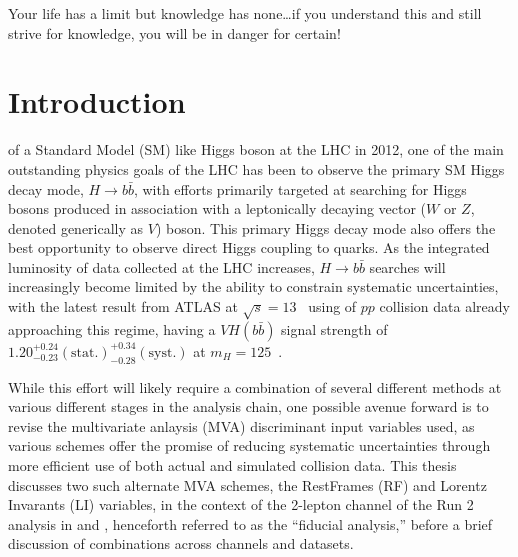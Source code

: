 \begin{savequote}[75mm]
Your life has a limit but knowledge has none\ldots if you understand this and still strive for knowledge, you will be in danger for certain!
\end{savequote}

\chapter{Introduction}

 of a Standard Model (SM) like Higgs boson at the LHC in 2012\cite{:2012gk}\cite{:2012gu}, one of the main outstanding physics goals of the LHC has been to observe the primary SM Higgs decay mode, $H\to b\bar{b}$, with efforts primarily targeted at searching for Higgs bosons produced in association with a leptonically decaying vector ($W$ or $Z$, denoted generically as $V$) boson.  This primary Higgs decay mode also offers the best opportunity to observe direct Higgs coupling to quarks.  As the integrated luminosity of data collected at the LHC increases, $H\to b\bar{b}$ searches will increasingly become limited by the ability to constrain systematic uncertainties, with the latest result from ATLAS at $\sqrt{s}=13$ \TeV\, using \LUMI of $pp$ collision data already approaching this regime, having a $VH\left(b\bar{b}\right)$ signal strength of $1.20^{+0.24}_{-0.23}(\textrm{stat.})^{+0.34}_{-0.28}(\textrm{syst.})$ at $m_{H}=125$ \GeV\,\cite{paper}.

While this effort will likely require a combination of several different methods at various different stages in the analysis chain, one possible avenue forward is to revise the multivariate anlaysis (MVA) discriminant input variables used, as various schemes offer the promise of reducing systematic uncertainties through more efficient use of both actual and simulated collision data.  This thesis discusses two such alternate MVA schemes, the RestFrames (RF) and Lorentz Invarants (LI) variables, in the context of the 2-lepton channel of the Run 2 analysis in \cite{paper} and \cite{supportnote}, henceforth referred to as the ``fiducial analysis,'' before a brief discussion of combinations across channels and datasets.



